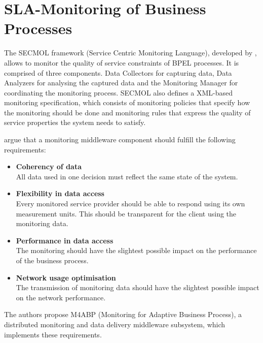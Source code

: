 \section{SLA-Monitoring of Business Processes}
The SECMOL framework (Service Centric Monitoring Language), developed by \citet{Guinea:2009fk}, allows to monitor the quality of service constraints of BPEL processes. It is comprised of three components. Data Collectors for capturing data, Data Analyzers for analysing the captured data and the Monitoring Manager for coordinating the monitoring process. SECMOL also defines a XML-based monitoring specification, which consists of monitoring policies that specify how the monitoring should be done and monitoring rules that express the quality of service properties the system needs to satisfy.

\citet{Duc:2009kx} argue that a monitoring middleware component should fulfill the following requirements:
\begin{itemize}
	\item \textbf{Coherency of data}\\
	All data used in one decision must reflect the same state of the system.
	\item \textbf{Flexibility in data access}\\
	Every monitored service provider should be able to respond using its own measurement units. This should be transparent for the client using the monitoring data.
	\item \textbf{Performance in data access}\\
	The monitoring should have the slightest possible impact on the performance of the business process.
	\item \textbf{Network usage optimisation}\\
	The transmission of monitoring data should have the slightest possible impact on the network performance.
\end{itemize}
The authors propose M4ABP (Monitoring for Adaptive Business Process), a distributed monitoring and data delivery middleware subsystem, which implements these requirements.

